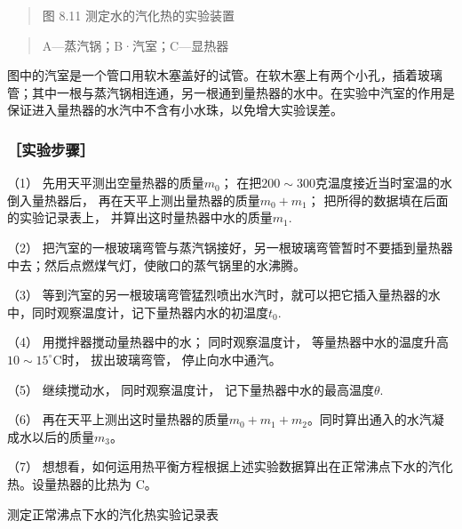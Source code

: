 \begin{quote}
图 8.11 测定水的汽化热的实验装置
\end{quote}

\begin{quote}
A---蒸汽锅；B·汽室；C---显热器
\end{quote}

图中的汽室是一个管口用软木塞盖好的试管。在软木塞上有两个小孔，插着玻璃管；其中一根与蒸汽锅相连通，另一根通到量热器的水中。在实验中汽室的作用是保证进入量热器的水汽中不含有小水珠，以免增大实验误差。

\subsubsection{［实验步骤］}\label{ux5b9eux9a8cux6b65ux9aa4}

（1） 先用天平测出空量热器的质量\(m_0\)；
在把\(200 \sim 300\)克温度接近当时室温的水倒入量热器后，
再在天平上测出量热器的质量\(m_0 + m_1\)；
把所得的数据填在后面的实验记录表上， 并算出这时量热器中水的质量\(m_1\).

（2）
把汽室的一根玻璃弯管与蒸汽锅接好，另一根玻璃弯管暂时不要插到量热器中去；然后点燃煤气灯，使敞口的蒸气锅里的水沸腾。

（3）
等到汽室的另一根玻璃弯管猛烈喷出水汽时，就可以把它插入量热器的水中，同时观察温度计，记下量热器内水的初温度\(t_0\).

（4） 用搅拌器搅动量热器中的水； 同时观察温度计，
等量热器中水的温度升高\(10 \sim 15^{\circ} \mathrm{C}\)时，
拔出玻璃弯管， 停止向水中通汽。

（5） 继续搅动水， 同时观察温度计， 记下量热器中水的最高温度\(\theta\).

（6）
再在天平上测出这时量热器的质量\(m_0 + m_1 + m_2\)。同时算出通入的水汽凝成水以后的质量\(m_3\)。

（7）
想想看，如何运用热平衡方程根据上述实验数据算出在正常沸点下水的汽化热。设量热器的比热为
C。

测定正常沸点下水的汽化热实验记录表

